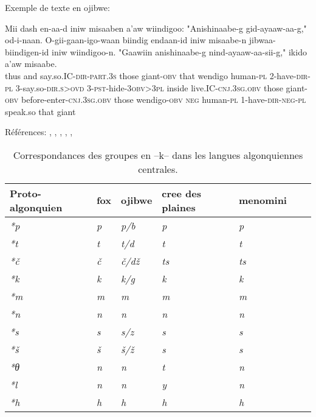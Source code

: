 \documentclass[twoside,a4paper,11pt]{article}
\newcommand{\ipa}[1]{{\phon\textit{#1}}}
\newcommand{\Σ}{\greek{Σ}}
\begin{document}
Exemple de texte en ojibwe:

\begin{exe} 
 \ex 
\gll \tx   Mii  dash en-aa-d                        iniw  misaaben       a'aw wiindigoo: "Anishinaabe-g       gid-ayaaw-aa-g,"               od-i-naan. O-gii-gaan-igo-waan              biindig endaan-id                iniw  misaabe-n jibwaa-biindigen-id               iniw  wiindigoo-n.      "Gaawiin anishinaabe-g nind-ayaaw-aa-sii-g,"                  ikido    a'aw misaabe. \\ 
      thus and  say.so.IC-\textsc{dir}-\textsc{part}.3\textsc{s} those giant-\textsc{obv}  that  wendigo    human-\textsc{pl}    2-have-\textsc{dir}-\textsc{pl}    3-say.so-\textsc{dir}.\textsc{s}>\textsc{ovd}  3-\textsc{pst}-hide-3\textsc{obv}>3\textsc{pl} inside  live.IC-\textsc{cnj}.3\textsc{sg}.\textsc{obv} those giant-\textsc{obv}  before-enter-\textsc{cnj}.3\textsc{sg}.\textsc{obv} those wendigo-\textsc{obv}  \textsc{neg}     human-\textsc{pl} 1-have-\textsc{dir}-\textsc{neg}-\textsc{pl}    speak.so that giant \\ 
\end{exe} 
 
 


Références: 
\citet{bloomfield25central}, \citet{bloomfield28thk}, \citet{bloomfield46proto}, \citet{siebert41clusters}, \citet{goddard74arapaho}, \citet{jacques13arapaho}
 
 
\begin{table}[h]
\caption{Correspondances des groupes en --k-- dans les langues algonquiennes centrales.} \centering  \label{tab:c.simple}
\begin{tabular}{lllllll}
\toprule
Proto-algonquien & fox & ojibwe & cree des plaines & menomini \\
\midrule
\ipa{*p} & 	\ipa{p} & 	\ipa{p/b} & 	\ipa{p} & 	\ipa{p} & 	\\
\ipa{*t} & 	\ipa{t} & 	\ipa{t/d} & 	\ipa{t} & 	\ipa{t} & 	\\
\ipa{*č} & 	\ipa{č} & 	\ipa{č/dž} & 	\ipa{ts} & 	\ipa{ts} & 	\\
\ipa{*k} & 	\ipa{k} & 	\ipa{k/g} & 	\ipa{k} & 	\ipa{k} & 	\\
\ipa{*m} & 	\ipa{m} & 	\ipa{m} & 	\ipa{m} & 	\ipa{m} & 	\\
\ipa{*n} & 	\ipa{n} & 	\ipa{n} & 	\ipa{n} & 	\ipa{n} & 	\\
\ipa{*s} & 	\ipa{s} & 	\ipa{s/z} & 	\ipa{s} & 	\ipa{s} & 	\\
\ipa{*š} & 	\ipa{š} & 	\ipa{š/ž} & 	\ipa{s} & 	\ipa{s} & 	\\
\ipa{*θ} & 	\ipa{n} & 	\ipa{n} & 	\ipa{t} & 	\ipa{n} & 	\\
\ipa{*l} & 	\ipa{n} & 	\ipa{n} & 	\ipa{y} & 	\ipa{n} & 	\\
\ipa{*h} & 	\ipa{h} & 	\ipa{h} & 	\ipa{h} & 	\ipa{h} & 	\\
\bottomrule
\end{tabular}
\end{table}
\end{document}
